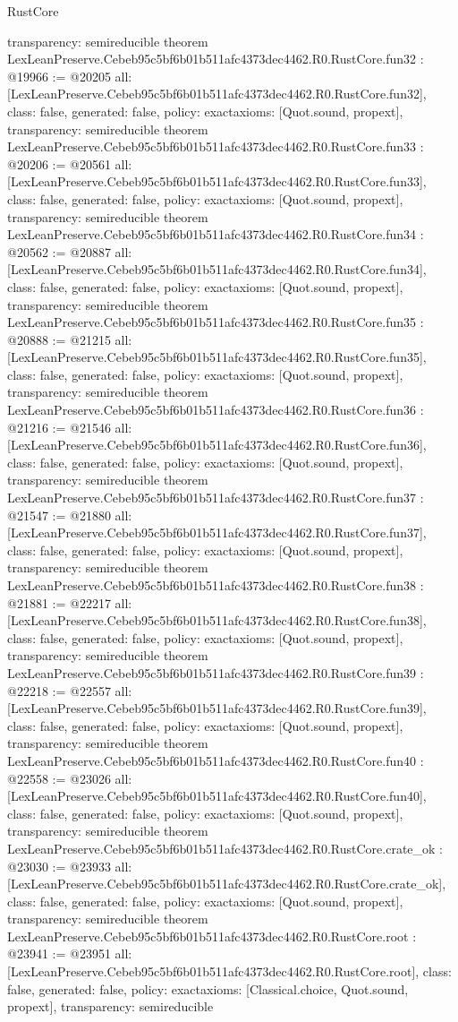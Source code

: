 \begin{lexlean}{RustCore}
\begin{coremodule}
{  transparency: semireducible
}
theorem LexLeanPreserve.Cebeb95c5bf6b01b511afc4373dec4462.R0.RustCore.fun32 : @19966 := @20205 {
  all: [LexLeanPreserve.Cebeb95c5bf6b01b511afc4373dec4462.R0.RustCore.fun32],
  class: false,
  generated: false,
  policy: exact{axioms: [Quot.sound, propext]},
  transparency: semireducible
}
theorem LexLeanPreserve.Cebeb95c5bf6b01b511afc4373dec4462.R0.RustCore.fun33 : @20206 := @20561 {
  all: [LexLeanPreserve.Cebeb95c5bf6b01b511afc4373dec4462.R0.RustCore.fun33],
  class: false,
  generated: false,
  policy: exact{axioms: [Quot.sound, propext]},
  transparency: semireducible
}
theorem LexLeanPreserve.Cebeb95c5bf6b01b511afc4373dec4462.R0.RustCore.fun34 : @20562 := @20887 {
  all: [LexLeanPreserve.Cebeb95c5bf6b01b511afc4373dec4462.R0.RustCore.fun34],
  class: false,
  generated: false,
  policy: exact{axioms: [Quot.sound, propext]},
  transparency: semireducible
}
theorem LexLeanPreserve.Cebeb95c5bf6b01b511afc4373dec4462.R0.RustCore.fun35 : @20888 := @21215 {
  all: [LexLeanPreserve.Cebeb95c5bf6b01b511afc4373dec4462.R0.RustCore.fun35],
  class: false,
  generated: false,
  policy: exact{axioms: [Quot.sound, propext]},
  transparency: semireducible
}
theorem LexLeanPreserve.Cebeb95c5bf6b01b511afc4373dec4462.R0.RustCore.fun36 : @21216 := @21546 {
  all: [LexLeanPreserve.Cebeb95c5bf6b01b511afc4373dec4462.R0.RustCore.fun36],
  class: false,
  generated: false,
  policy: exact{axioms: [Quot.sound, propext]},
  transparency: semireducible
}
theorem LexLeanPreserve.Cebeb95c5bf6b01b511afc4373dec4462.R0.RustCore.fun37 : @21547 := @21880 {
  all: [LexLeanPreserve.Cebeb95c5bf6b01b511afc4373dec4462.R0.RustCore.fun37],
  class: false,
  generated: false,
  policy: exact{axioms: [Quot.sound, propext]},
  transparency: semireducible
}
theorem LexLeanPreserve.Cebeb95c5bf6b01b511afc4373dec4462.R0.RustCore.fun38 : @21881 := @22217 {
  all: [LexLeanPreserve.Cebeb95c5bf6b01b511afc4373dec4462.R0.RustCore.fun38],
  class: false,
  generated: false,
  policy: exact{axioms: [Quot.sound, propext]},
  transparency: semireducible
}
theorem LexLeanPreserve.Cebeb95c5bf6b01b511afc4373dec4462.R0.RustCore.fun39 : @22218 := @22557 {
  all: [LexLeanPreserve.Cebeb95c5bf6b01b511afc4373dec4462.R0.RustCore.fun39],
  class: false,
  generated: false,
  policy: exact{axioms: [Quot.sound, propext]},
  transparency: semireducible
}
theorem LexLeanPreserve.Cebeb95c5bf6b01b511afc4373dec4462.R0.RustCore.fun40 : @22558 := @23026 {
  all: [LexLeanPreserve.Cebeb95c5bf6b01b511afc4373dec4462.R0.RustCore.fun40],
  class: false,
  generated: false,
  policy: exact{axioms: [Quot.sound, propext]},
  transparency: semireducible
}
theorem LexLeanPreserve.Cebeb95c5bf6b01b511afc4373dec4462.R0.RustCore.crate_ok : @23030 := @23933 {
  all: [LexLeanPreserve.Cebeb95c5bf6b01b511afc4373dec4462.R0.RustCore.crate_ok],
  class: false,
  generated: false,
  policy: exact{axioms: [Quot.sound, propext]},
  transparency: semireducible
}
theorem LexLeanPreserve.Cebeb95c5bf6b01b511afc4373dec4462.R0.RustCore.root : @23941 := @23951 {
  all: [LexLeanPreserve.Cebeb95c5bf6b01b511afc4373dec4462.R0.RustCore.root],
  class: false,
  generated: false,
  policy: exact{axioms: [Classical.choice, Quot.sound, propext]},
  transparency: semireducible
}


\end{coremodule}
\end{lexlean}
